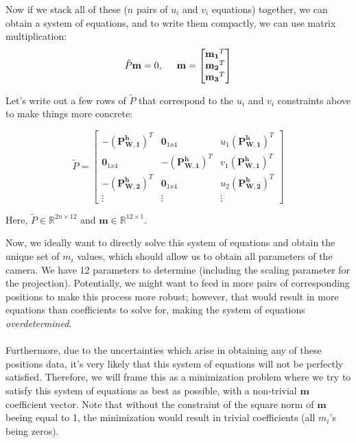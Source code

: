 \documentclass[]{article}
\begin{document}
Now if we stack all of these ($n$ pairs of $u_i$ and $v_i$ equations) together, we can obtain a system of equations, and to write them compactly, we can use matrix multiplication:
\begin{equation}
    \tilde{P}\mathbf{m} = 0, \hspace{5mm} \mathbf{m} =
    \begin{bmatrix}
    \mathbf{m_1}^T \\
    \mathbf{m_2}^T \\
    \mathbf{m_3}^T
\end{bmatrix}
\end{equation}

Let's write out a few rows of $\tilde{P}$ that correspond to the $u_i$ and $v_i$ constraints above to make things more concrete:

\begin{equation}
\tilde{P} =
     \begin{bmatrix}
  -(\mathbf{P_{W,1}^h})^T & \mathbf{0}_{1x4} & u_{1} (\mathbf{P_{W,1}^h})^T \\
  \mathbf{0}_{1x4} & -(\mathbf{P_{W,1}^h})^T & v_{1} (\mathbf{P_{W,1}^h})^T  \\
  -(\mathbf{P_{W,2}^h})^T & \mathbf{0}_{1x4} & u_{2} (\mathbf{P_{W,2}^h})^T \\
  \vdots & \vdots & \vdots
 \end{bmatrix}
\end{equation}

Here, $\tilde{P} \in \mathbb{R}^{2n \times 12}$ and $\mathbf{m} \in \mathbb{R}^{12 \times 1}$.

Now, we ideally want to directly solve this system of equations and obtain the unique set of $m_i$ values, which should allow us to obtain all parameters of the camera. We have 12 parameters to determine (including the scaling parameter for the projection). Potentially, we might want to feed in more pairs of corresponding positions to make this process more robust; however, that would result in more equations than coefficients to solve for, making the system of equations \textit{overdetermined}. \\\\
Furthermore, due to the uncertainties which arise in obtaining any of these positions data, it's very likely that this system of equations will not be perfectly satisfied. Therefore, we will frame this as a minimization problem where we try to satisfy this system of equations as best as possible, with a non-trivial $\mathbf{m}$ coefficient vector. Note that without the constraint of the square norm of $\mathbf{m}$ beeing equal to 1, the minimization would result in trivial coefficients (all $m_i$'s being zeros).
\end{document}
